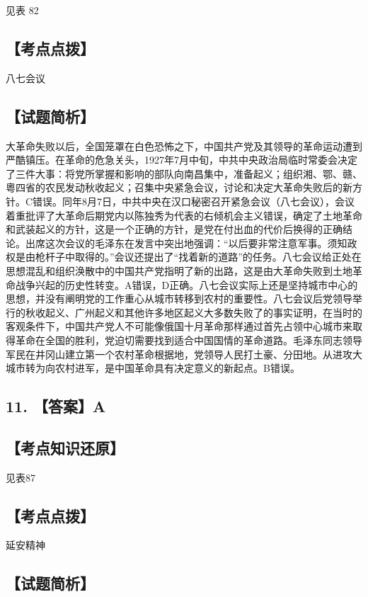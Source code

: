 \documentclass[UTF8,11pt]{ctexart}
\begin{document}
见表 82


\subsection*{【考点点拨】}

八七会议


\subsection*{【试题简析】}

大革命失败以后，全国笼罩在白色恐怖之下，中国共产党及其领导的革命运动遭到严酷镇压。在革命的危急关头，1927年7月中旬，中共中央政治局临时常委会决定了三件大事：将党所掌握和影响的部队向南昌集中，准备起义；组织湘、鄂、赣、粵四省的农民发动秋收起义；召集中央紧急会议，讨论和决定大革命失败后的新方针。C错误。同年8月7日，中共中央在汉口秘密召开紧急会议（八七会议），会议着重批评了大革命后期党内以陈独秀为代表的右倾机会主义错误，确定了土地革命和武装起义的方针，这是一个正确的方针，是党在付出血的代价后换得的正确结论。出席这次会议的毛泽东在发言中突出地强调：“以后要非常注意军事。须知政权是由枪杆子中取得的。”会议还提出了“找着新的道路”的任务。八七会议给正处在思想混乱和组织涣散中的中国共产党指明了新的出路，这是由大革命失败到土地革命战争兴起的历史性转变。A错误，D正确。八七会议实际上还是坚持城市中心的思想，并没有阐明党的工作重心从城市转移到农村的重要性。八七会议后党领导举行的秋收起义、广州起义和其他许多地区起义大多数失败了的事实证明，在当时的客观条件下，中国共产党人不可能像俄国十月革命那样通过首先占领中心城市来取得革命在全国的胜利，党迫切需要找到适合中国国情的革命道路。毛泽东同志领导军民在井冈山建立第一个农村革命根据地，党领导人民打土豪、分田地。从进攻大城市转为向农村进军，是中国革命具有决定意义的新起点。B错误。


\subsection*{11. 【答案】A}

\subsection*{【考点知识还原】}

见表87


\subsection*{【考点点拨】}

延安精神


\subsection*{【试题简析】}
\end{document}
